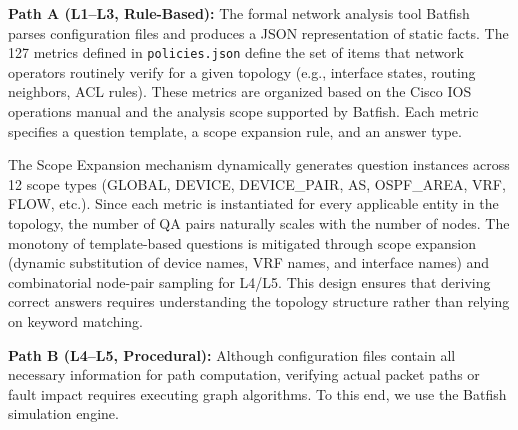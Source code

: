 \textbf{Path A (L1--L3, Rule-Based):}
The formal network analysis tool Batfish~\cite{ref17} parses configuration files and produces a JSON representation of static facts.
The 127 metrics defined in \texttt{policies.json} define the set of items that network operators routinely verify for a given topology (e.g., interface states, routing neighbors, ACL rules). These metrics are organized based on the Cisco IOS operations manual and the analysis scope supported by Batfish.
Each metric specifies a question template, a scope expansion rule, and an answer type.

The Scope Expansion mechanism dynamically generates question instances across 12 scope types (GLOBAL, DEVICE, DEVICE\_PAIR, AS, OSPF\_AREA, VRF, FLOW, etc.). Since each metric is instantiated for every applicable entity in the topology, the number of QA pairs naturally scales with the number of nodes.
The monotony of template-based questions is mitigated through scope expansion (dynamic substitution of device names, VRF names, and interface names) and combinatorial node-pair sampling for L4/L5.
This design ensures that deriving correct answers requires understanding the topology structure rather than relying on keyword matching.



\textbf{Path B (L4--L5, Procedural):}
Although configuration files contain all necessary information for path computation, verifying actual packet paths or fault impact requires executing graph algorithms. To this end, we use the Batfish simulation engine.

